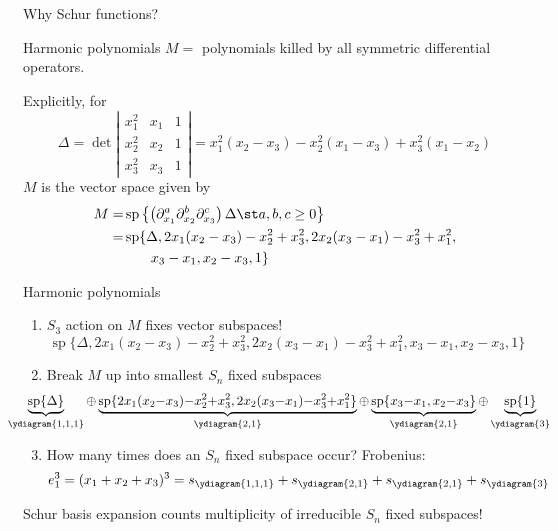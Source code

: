 \documentclass{beamer}
\renewcommand{\Span}{\operatorname{sp}}
\begin{document}
\begin{frame}{Why Schur functions?}
  \begin{block}{Harmonic polynomials}
   \(M =\) polynomials killed by all symmetric differential
   operators.
  \end{block}\pause
  Explicitly, for
   \[
     \Delta = \det \left|
       \begin{matrix}
         x_1^2 & x_1 & 1\\
         x_2^2 & x_2 & 1\\
         x_3^2 & x_3 & 1
       \end{matrix}
     \right| = x_1^2(x_2-x_3) - x_2^2 (x_1 - x_3) + x_3^2(x_1-x_2)
   \]\pause
   \(M\) is the vector space given by\pause
   \begin{align*}
       M  = & \Span\left\{
\left(           \partial_{x_1}^a
           \partial_{x_2}^b  \partial_{x_3}^c
\right)         \Delta \st a,b,c \geq 0\right\} \\
        = & \Span\{\Delta, 2x_1(x_2-x_3)-x_2^2+x_3^2,
            2x_2(x_3-x_1)-x_3^2+x_1^2, \\
       & \phantom{\Span\{\}}x_3-x_1, x_2-x_3,1\}
   \end{align*}
\end{frame}
\begin{frame}{Harmonic polynomials}
  \begin{enumerate}
  \item \(S_3\) action on \(M\) fixes vector subspaces!
  \[
\Span\{\Delta, 2x_1(x_2-x_3)-x_2^2+x_3^2,
            2x_2(x_3-x_1)-x_3^2+x_1^2, 
       x_3-x_1, x_2-x_3,1\}
  \]\pause 
\item Break \(M\) up into smallest \(S_n\) fixed subspaces \pause
  \[
    \hspace{-2.9em}
    \scalebox{0.95}{\(
      \underbrace{\Span\{\Delta\}}_{\ydiagram{1,1,1}} {\oplus} \underbrace{\Span\{2x_1(x_2{-}x_3){-}x_2^2{+}x_3^2,
        2x_2(x_3{-}x_1){-}x_3^2{+}x_1^2\}}_{\ydiagram{2,1}} {\oplus}
      \underbrace{\Span\{x_3{-}x_1, x_2{-}x_3\}}_{\ydiagram{2,1}} {\oplus} \underbrace{\Span\{1\}}_{\ydiagram{3}}\)}
  \]\pause
  \item How many times does an \(S_n\) fixed subspace occur? \pause
    Frobenius: \pause
    \[
      e_1^3 = (x_1+x_2+x_3)^3 = s_{\ydiagram{1,1,1}} + s_{\ydiagram{2,1}} +
      s_{\ydiagram{2,1}} + s_{\ydiagram{3}}
    \]
  \end{enumerate}
  \pause
  Schur basis expansion counts multiplicity of irreducible \(S_n\)
  fixed subspaces!
\end{frame}
\end{document}
